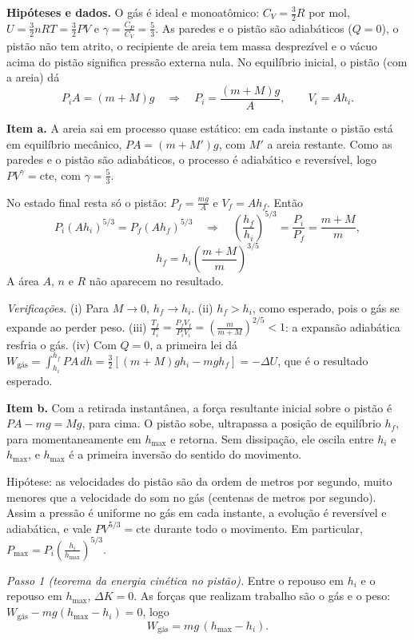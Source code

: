 \documentclass{article}%
\begin{document}
\textbf{Hipóteses e dados.} O gás é ideal e monoatômico: $C_V=\frac{3}{2}R$ por mol, $U=\frac{3}{2}nRT=\frac{3}{2}PV$ e $\gamma=\frac{C_P}{C_V}=\frac{5}{3}$. As paredes e o pistão são adiabáticos ($Q=0$), o pistão não tem atrito, o recipiente de areia tem massa desprezível e o vácuo acima do pistão significa pressão externa nula. No equilíbrio inicial, o pistão (com a areia) dá
\[
P_iA=(m+M)g \quad\Rightarrow\quad P_i=\frac{(m+M)g}{A},\qquad V_i=Ah_i .
\]

\textbf{Item a.} A areia sai em processo quase estático: em cada instante o pistão está em equilíbrio mecânico, $PA=(m+M')g$, com $M'$ a areia restante. Como as paredes e o pistão são adiabáticos, o processo é adiabático e reversível, logo $PV^{\gamma}=\text{cte}$, com $\gamma=\frac{5}{3}$.

No estado final resta só o pistão: $P_f=\frac{mg}{A}$ e $V_f=Ah_f$. Então
\[
P_i(Ah_i)^{5/3}=P_f(Ah_f)^{5/3}\quad\Rightarrow\quad \left(\frac{h_f}{h_i}\right)^{5/3}=\frac{P_i}{P_f}=\frac{m+M}{m},
\]
\[
\boxed{h_f=h_i\left(\frac{m+M}{m}\right)^{3/5}}
\]
A área $A$, $n$ e $R$ não aparecem no resultado.

\textit{Verificações.} (i) Para $M\to 0$, $h_f\to h_i$. (ii) $h_f>h_i$, como esperado, pois o gás se expande ao perder peso. (iii) $\frac{T_f}{T_i}=\frac{P_fV_f}{P_iV_i}=\left(\frac{m}{m+M}\right)^{2/5}<1$: a expansão adiabática resfria o gás. (iv) Com $Q=0$, a primeira lei dá $W_{\text{gás}}=\int_{h_i}^{h_f}PA\,dh=\frac{3}{2}\left[(m+M)gh_i-mgh_f\right]=-\Delta U$, que é o resultado esperado.

\textbf{Item b.} Com a retirada instantânea, a força resultante inicial sobre o pistão é $PA-mg=Mg$, para cima. O pistão sobe, ultrapassa a posição de equilíbrio $h_f$, para momentaneamente em $h_{\max}$ e retorna. Sem dissipação, ele oscila entre $h_i$ e $h_{\max}$, e $h_{\max}$ é a primeira inversão do sentido do movimento.

Hipótese: as velocidades do pistão são da ordem de metros por segundo, muito menores que a velocidade do som no gás (centenas de metros por segundo). Assim a pressão é uniforme no gás em cada instante, a evolução é reversível e adiabática, e vale $PV^{5/3}=\text{cte}$ durante todo o movimento. Em particular, $P_{\max}=P_i\left(\frac{h_i}{h_{\max}}\right)^{5/3}$.

\textit{Passo 1 (teorema da energia cinética no pistão).} Entre o repouso em $h_i$ e o repouso em $h_{\max}$, $\Delta K=0$. As forças que realizam trabalho são o gás e o peso: $W_{\text{gás}}-mg(h_{\max}-h_i)=0$, logo
\[
W_{\text{gás}}=mg\,(h_{\max}-h_i).
\]
\end{document}
